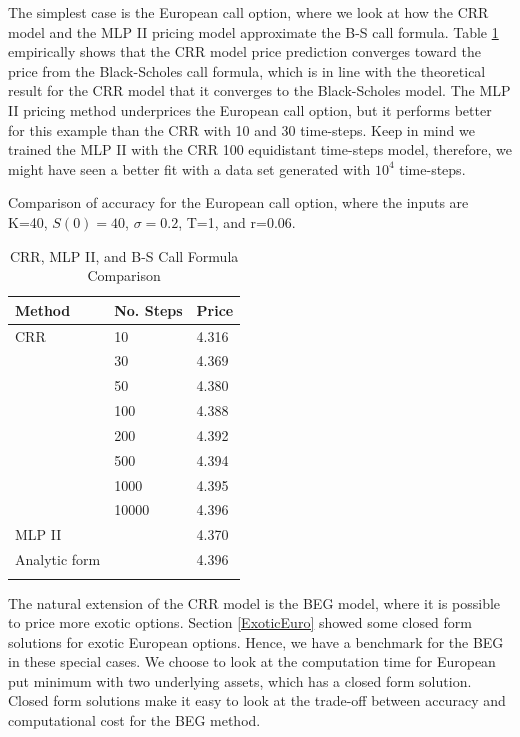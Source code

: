 The simplest case is the European call option, where we look at how the CRR model and the MLP II pricing model approximate the B-S call formula. Table \ref{tab:EuroCall} empirically shows that the CRR model price prediction converges toward the price from the Black-Scholes call formula, which is in line with the theoretical result for the CRR model that it converges to the Black-Scholes model. The MLP II pricing method underprices the European call option, but it performs better for this example than the CRR with 10 and 30 time-steps. Keep in mind we trained the MLP II with the CRR 100 equidistant time-steps model, therefore, we might have seen a better fit with a data set generated with $10^4$ time-steps.\\

\begin{table}[th]
\caption{CRR, MLP II, and B-S Call Formula Comparison}{Comparison of accuracy for the European call option, where the inputs are K=40, $S(0)=40$, $\sigma=0.2$, T=1, and r=0.06.}\\
\label{tab:EuroCall}
\centering
\begin{tabular}{l l l}
\toprule
\textbf{Method} & \textbf{No. Steps} & \textbf{Price} \\
\midrule
CRR & 10 & 4.316\\
& 30 & 4.369\\
& 50 & 	4.380\\
& 100 & 4.388\\
& 200 & 4.392\\
& 500 & 4.394\\
& 1000 & 4.395\\
& 10000 & 4.396\\
MLP II & & 4.370\\
Analytic form & & 4.396\\
\bottomrule\\
\end{tabular}
\end{table}

The natural extension of the CRR model is the BEG model, where it is possible to price more exotic options. Section \ref{ExoticEuro} showed some closed form solutions for exotic European options. Hence, we have a benchmark for the BEG in these special cases. We choose to look at the computation time for European put minimum with two underlying assets, which has a closed form solution. Closed form solutions make it easy to look at the trade-off between accuracy and computational cost for the BEG method. \\


